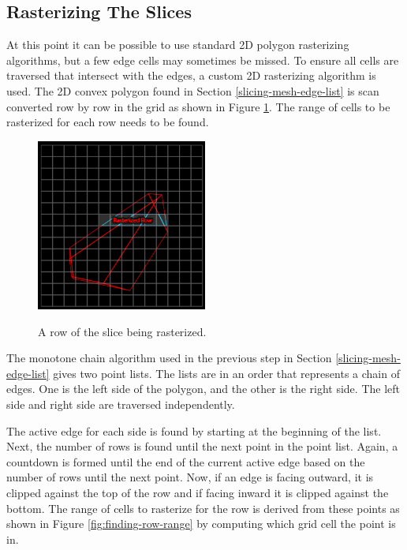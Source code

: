 \documentclass[12pt]{ucthesis}
\newcommand{\captionfonts}{\small\bf\ssp}
\begin{document}
\subsection{Rasterizing The Slices}
\label{rasterizing-the-slices}

At this point it can be possible to use standard 2D polygon rasterizing algorithms, but a few edge cells may sometimes be missed.
To ensure all cells are traversed that intersect with the edges, a custom 2D rasterizing algorithm is used.
The 2D convex polygon found in Section \ref{slicing-mesh-edge-list} is scan converted row by row in the grid as shown in Figure \ref{fig:rasterized-row}.
The range of cells to be rasterized for each row needs to be found.

\begin{figure}
\begin{center}
\includegraphics[width=0.5\textwidth]{Images/RasterizingAlgorithm/Final/FrustSliceNRowOrthoLabeled.png}
\captionfonts
\caption[Mesh Edge List Row]{A row of the slice being rasterized.}
\label{fig:rasterized-row}
\end{center}
\end{figure}

The monotone chain algorithm used in the previous step in Section \ref{slicing-mesh-edge-list} gives two point lists.
The lists are in an order that represents a chain of edges.
One is the left side of the polygon, and the other is the right side.
The left side and right side are traversed independently.

The active edge for each side is found by starting at the beginning of the list.
Next, the number of rows is found until the next point in the point list.
Again, a countdown is formed until the end of the current active edge based on the number of rows until the next point.
Now, if an edge is facing outward, it is clipped against the top of the row and if facing inward it is clipped against the bottom.
The range of cells to rasterize for the row is derived from these points as shown in Figure \ref{fig:finding-row-range} by computing which grid cell the point is in.
\end{document}

